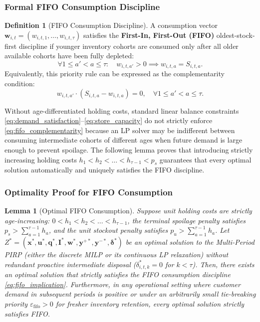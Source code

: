 \documentclass[11pt,a4paper]{article}
\newtheorem{lemma}{Lemma}
\theoremstyle{definition}
\newtheorem{definition}{Definition}
\theoremstyle{remark}
\begin{document}
\subsubsection{Formal FIFO Consumption Discipline}
\begin{definition}[FIFO Consumption Discipline]
\label{def:fifo_discipline}
A consumption vector $\mathbf{w}_{i,t} = (w_{i,t,1}, \dots, w_{i,t,\tau})$ satisfies the \textbf{First-In, First-Out (FIFO)} oldest-stock-first discipline if younger inventory cohorts are consumed only after all older available cohorts have been fully depleted:
\begin{equation}
    \forall 1 \le a' < a \le \tau: \quad w_{i,t,a'} > 0 \implies w_{i,t,a} = S_{i,t,a}. \label{eq:fifo_implication}
\end{equation}
Equivalently, this priority rule can be expressed as the complementarity condition:
\begin{equation}
    w_{i,t,a'} \cdot \left( S_{i,t,a} - w_{i,t,a} \right) = 0, \quad \forall 1 \le a' < a \le \tau. \label{eq:fifo_complementarity}
\end{equation}
\end{definition}

Without age-differentiated holding costs, standard linear balance constraints \eqref{eq:demand_satisfaction}--\eqref{eq:store_capacity} do not strictly enforce \eqref{eq:fifo_complementarity} because an LP solver may be indifferent between consuming intermediate cohorts of different ages when future demand is large enough to prevent spoilage. The following lemma proves that introducing strictly increasing holding costs $h_1 < h_2 < \dots < h_{\tau-1} < p_s$ guarantees that every optimal solution automatically and uniquely satisfies the FIFO discipline.

\subsubsection{Optimality Proof for FIFO Consumption}
\begin{lemma}[Optimal FIFO Consumption]
\label{lem:fifo_optimality}
Suppose unit holding costs are strictly age-increasing: $0 < h_1 < h_2 < \dots < h_{\tau-1}$, the terminal spoilage penalty satisfies $p_s > \sum_{a=1}^{\tau-1} h_a$, and the unit stockout penalty satisfies $p_u > \sum_{a=1}^{\tau-1} h_a$. Let $Z^* = (\mathbf{x}^*, \mathbf{u}^*, \mathbf{q}^*, \mathbf{I}^*, \mathbf{w}^*, \mathbf{y}^{+*}, \mathbf{y}^{-*}, \boldsymbol{\delta}^*)$ be an optimal solution to the Multi-Period PIRP (either the discrete MILP or its continuous LP relaxation) without redundant proactive intermediate disposal ($\delta_{i,t,k}^* = 0$ for $k < \tau$). Then, there exists an optimal solution that strictly satisfies the FIFO consumption discipline \eqref{eq:fifo_implication}. Furthermore, in any operational setting where customer demand in subsequent periods is positive or under an arbitrarily small tie-breaking priority $\varepsilon_{\text{fifo}} > 0$ for fresher inventory retention, every optimal solution strictly satisfies FIFO.
\end{lemma}
\end{document}
